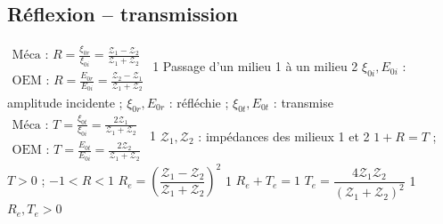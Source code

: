 \subsection{Réflexion -- transmission}
\begin{formules}
    {$\begin{gathered}
      \text{Méca : } R = \frac{\xi_{0r}}{\xi_{0i}} = \frac{\mathcal{Z}_1 - \mathcal{Z}_2}{\mathcal{Z}_1 + \mathcal{Z}_2} \\
      \text{OEM : } R = \frac{E_{0r}}{E_{0i}} = \frac{\mathcal{Z}_2 - \mathcal{Z}_1}{\mathcal{Z}_1 + \mathcal{Z}_2}
     \end{gathered}$}
    {1}
    {Passage d'un milieu 1 à un milieu 2 \newline
     $\xi_{0i}, E_{0i}$ : amplitude incidente ; $\xi_{0r}, E_{0r}$ : réfléchie ; $\xi_{0t}, E_{0t}$ : transmise}
    {$\begin{gathered}
      \text{Méca : } T = \frac{\xi_{0t}}{\xi_{0i}} = \frac{2\mathcal{Z}_1}{\mathcal{Z}_1 + \mathcal{Z}_2} \\
      \text{OEM : } T = \frac{E_{0t}}{E_{0i}} = \frac{2\mathcal{Z}_2}{\mathcal{Z}_1 + \mathcal{Z}_2}
     \end{gathered}$}
    {1}
    {$\mathcal{Z}_1, \mathcal{Z}_2$ : impédances des milieux 1 et 2 \newline
     $1 + R = T$ ; $T > 0$ ; \newline $-1 < R < 1$}
    {$R_e = \left(\dfrac{\mathcal{Z}_1 - \mathcal{Z}_2}{\mathcal{Z}_1 + \mathcal{Z}_2}\right)^2$}
    {1}
    {$R_e + T_e = 1$}
    {$T_e = \dfrac{4\mathcal{Z}_1\mathcal{Z}_2}{(\mathcal{Z}_1 + \mathcal{Z}_2)^2}$}
    {1}
    {$R_e, T_e > 0$}
\end{formules}

